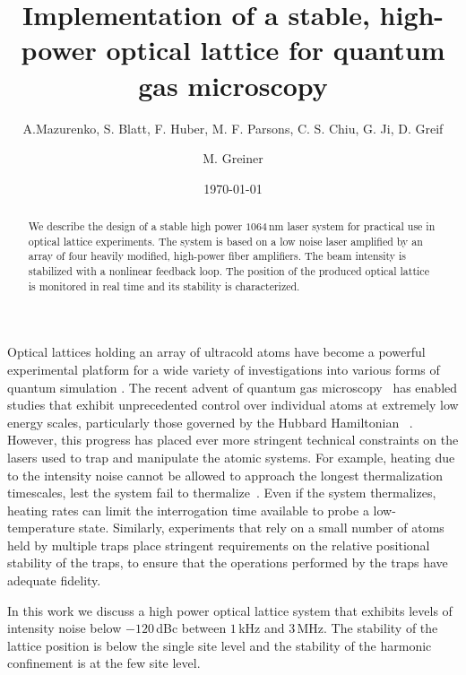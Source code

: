 \documentclass[twocolumn,aps,pra,showpacs,preprintnumbers,bibnotes]{revtex4-1}
\begin{document}
\title{Implementation of a stable, high-power optical lattice for quantum gas microscopy}


\author{A.Mazurenko, S. Blatt, F. Huber, M. F. Parsons, C. S. Chiu, G. Ji, D. Greif}
\author{M. Greiner}

\date{\today}
\begin{abstract}
 We describe the design of a stable high power $1064\,$nm laser system for practical use in optical lattice experiments. The system is based on a low noise laser amplified by an array of four heavily modified, high-power fiber amplifiers. The beam intensity is stabilized with a nonlinear feedback loop. The position of the produced optical lattice is monitored in real time and its stability is characterized.
\end{abstract}
\maketitle

Optical lattices holding an array of ultracold atoms have become a powerful experimental platform for a wide variety of investigations into various forms of quantum simulation \cite{Friedenauer2008, Kim2010, Struck2011, Simon2011, Yan2013, Drewes2016, Murmann2015}. 
The recent advent of quantum gas microscopy~\cite{Bakr2009, Sherson2010, Haller2015, Cheuk2015, Parsons2015, Edge2015, Omran2015, Greif2016, Cheuk2016, Parsons2016, Boll2016, Cheuk2016a, Brown2016} has enabled studies that exhibit unprecedented control over individual atoms at extremely low energy scales, particularly those governed by the Hubbard Hamiltonian ~\cite{Hubbard1963}.
However, this progress has placed ever more stringent technical constraints on the lasers used to trap and manipulate the atomic systems.
For example, heating due to the intensity noise cannot be allowed to approach the longest thermalization timescales, lest the system fail to thermalize~\cite{Savard1997}.
Even if the system thermalizes, heating rates can limit the interrogation time available to probe a low-temperature state.
Similarly, experiments that rely on a small number of atoms held by multiple traps place stringent requirements on the relative positional stability of the traps, to ensure that the operations performed by the traps have adequate fidelity.

In this work we discuss a high power optical lattice system that exhibits levels of intensity noise below $-120\,$dBc between $1\,$kHz and $3\,$MHz.
The stability of the lattice position is below the single site level and the stability of the harmonic confinement is at the few site level.
\end{document}
